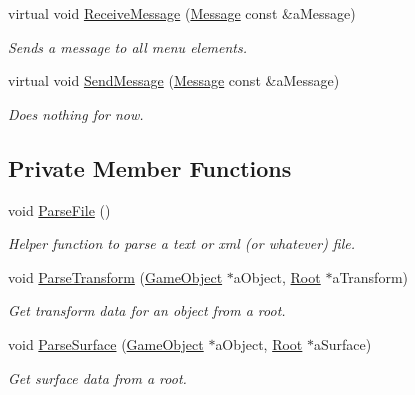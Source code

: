 \begin{DoxyCompactItemize}
virtual void \hyperlink{classMenu_a82445f44555111a9c15e47d59a82d045}{Receive\+Message} (\hyperlink{classMessage}{Message} const \&a\+Message)
\begin{DoxyCompactList}\small\item\em Sends a message to all menu elements. \end{DoxyCompactList}\item 
virtual void \hyperlink{classMenu_abb686c47e73879f919001dbc94078cbb}{Send\+Message} (\hyperlink{classMessage}{Message} const \&a\+Message)
\begin{DoxyCompactList}\small\item\em Does nothing for now. \end{DoxyCompactList}\end{DoxyCompactItemize}
\subsection*{Private Member Functions}
\begin{DoxyCompactItemize}
\item 
void \hyperlink{classMenu_a81e9ea0f86510401f9033dffc7381899}{Parse\+File} ()
\begin{DoxyCompactList}\small\item\em Helper function to parse a text or xml (or whatever) file. \end{DoxyCompactList}\item 
void \hyperlink{classMenu_afd6207275d9a0008990eb15be2ae63c3}{Parse\+Transform} (\hyperlink{classGameObject}{Game\+Object} $\ast$a\+Object, \hyperlink{classRoot}{Root} $\ast$a\+Transform)
\begin{DoxyCompactList}\small\item\em Get transform data for an object from a root. \end{DoxyCompactList}\item 
void \hyperlink{classMenu_aeaabed196b2b18d4123cb89662578528}{Parse\+Surface} (\hyperlink{classGameObject}{Game\+Object} $\ast$a\+Object, \hyperlink{classRoot}{Root} $\ast$a\+Surface)
\begin{DoxyCompactList}\small\item\em Get surface data from a root. \end{DoxyCompactList}\end{DoxyCompactItemize}
